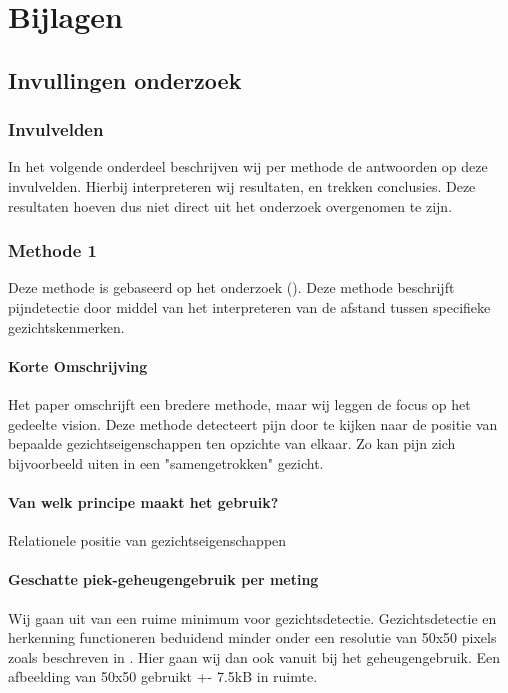 \documentclass[11pt]{article}
\begin{document}
    \section{Bijlagen}\label{sec:bijlagen}

    \subsection{Invullingen onderzoek}\label{subsec:invullingen-onderzoek}

    \subsubsection{Invulvelden}
    In het volgende onderdeel beschrijven wij per methode de antwoorden op deze invulvelden.
    Hierbij interpreteren wij resultaten, en trekken conclusies.
    Deze resultaten hoeven dus niet direct uit het onderzoek overgenomen te zijn.

    \subsubsection{Methode 1}
    Deze methode is gebaseerd op het onderzoek (\citet{werner2014automatic}).
    Deze methode beschrijft pijndetectie door middel van het interpreteren van de afstand tussen specifieke gezichtskenmerken.

    \paragraph{Korte Omschrijving}
    Het paper omschrijft een bredere methode, maar wij leggen de focus op het gedeelte vision.
    Deze methode detecteert pijn door te kijken naar de positie van bepaalde gezichtseigenschappen ten opzichte van elkaar.
    Zo kan pijn zich bijvoorbeeld uiten in een "samengetrokken" gezicht.

    \paragraph{Van welk principe maakt het gebruik?}
    Relationele positie van gezichtseigenschappen

    \paragraph{Geschatte piek-geheugengebruik per meting}
    Wij gaan uit van een ruime minimum voor gezichtsdetectie.
    Gezichtsdetectie en herkenning functioneren beduidend minder onder een resolutie van 50x50 pixels zoals beschreven in \citet{boom2006effect}.
    Hier gaan wij dan ook vanuit bij het geheugengebruik.
    Een afbeelding van 50x50 gebruikt +- 7.5kB in ruimte.
\end{document}
